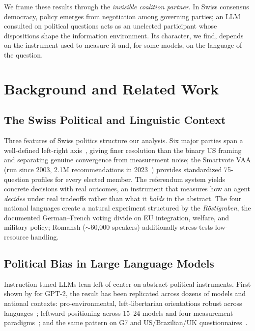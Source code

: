 \documentclass[11pt]{article}
\begin{document}
We frame these results through the \emph{invisible coalition partner}.
In Swiss consensus democracy, policy emerges from negotiation among governing parties; an LLM consulted on political questions acts as an unelected participant whose dispositions shape the information environment.
Its character, we find, depends on the instrument used to measure it and, for some models, on the language of the question.

\section{Background and Related Work}

\subsection{The Swiss Political and Linguistic Context}

Three features of Swiss politics structure our analysis.
Six major parties span a well-defined left-right axis~\citep{linder2010swiss}, giving finer resolution than the binary US framing and separating genuine convergence from measurement noise; the Smartvote VAA (run since 2003, 2.1M recommendations in 2023~\citep{smartvote2023}) provides standardized 75-question profiles for every elected member.
The referendum system yields concrete decisions with real outcomes, an instrument that measures how an agent \emph{decides} under real tradeoffs rather than what it \emph{holds} in the abstract.
The four national languages create a natural experiment structured by the \emph{R\"{o}stigraben}, the documented German--French voting divide on EU integration, welfare, and military policy; Romansh ($\sim$60{,}000 speakers) additionally stress-tests low-resource handling.

\subsection{Political Bias in Large Language Models}

Instruction-tuned LLMs lean left of center on abstract political instruments.
First shown by \citet{liu2022quantifying} for GPT-2, the result has been replicated across dozens of models and national contexts: pro-environmental, left-libertarian orientations robust across languages~\citep{hartmann2023political}; leftward positioning across 15--24 models and four measurement paradigms~\citep{rozado2023political, rozado2024political, rozado2025measuring}; and the same pattern on G7 and US/Brazilian/UK questionnaires~\citep{rutinowski2024self, motoki2024more}.
\end{document}
